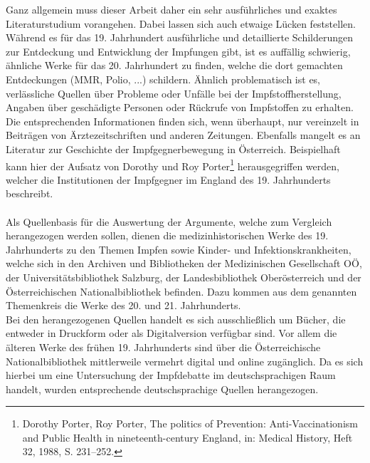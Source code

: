 \documentclass[
    a4paper,
    12pt,
    hyphens,
    chapterprefix=true,
    headheight=33pt,
    footheight=29pt,
    headings=optiontohead,
]{scrartcl}
\begin{document}
Ganz allgemein muss dieser Arbeit daher ein sehr ausführliches und exaktes Literaturstudium vorangehen. Dabei lassen sich auch etwaige Lücken feststellen. Während es für das 19. Jahrhundert ausführliche und detaillierte Schilderungen zur Entdeckung und Entwicklung der Impfungen gibt, ist es auffällig schwierig, ähnliche Werke für das 20. Jahrhundert zu finden, welche die dort gemachten Entdeckungen (MMR, Polio, ...) schildern. Ähnlich problematisch ist es, verlässliche Quellen über Probleme oder Unfälle bei der Impfstoffherstellung, Angaben über geschädigte Personen oder Rückrufe von Impfstoffen zu erhalten. Die entsprechenden Informationen finden sich, wenn überhaupt, nur vereinzelt in Beiträgen von Ärztezeitschriften und anderen Zeitungen. Ebenfalls mangelt es an Literatur zur Geschichte der Impfgegnerbewegung in Österreich. Beispielhaft kann hier der Aufsatz von Dorothy und Roy Porter\footnote{Dorothy Porter, Roy Porter, The politics of Prevention: Anti-Vaccinationism and Public Health in nineteenth-century England, in: Medical History, Heft 32, 1988, S. 231--252.} herausgegriffen werden, welcher die Institutionen der Impfgegner im England des 19. Jahrhunderts beschreibt.\\
\\
Als Quellenbasis für die Auswertung der Argumente, welche zum Vergleich herangezogen werden sollen, dienen die medizinhistorischen Werke des 19. Jahrhunderts zu den Themen Impfen sowie Kinder- und Infektionskrankheiten, welche sich in den Archiven und Bibliotheken der Medizinischen Gesellschaft OÖ, der Universitätsbibliothek Salzburg, der Landesbibliothek Oberösterreich und der Österreichischen Nationalbibliothek befinden. Dazu kommen aus dem genannten Themenkreis die Werke des 20. und 21. Jahrhunderts.\\
Bei den herangezogenen Quellen handelt es sich ausschließlich um Bücher, die entweder in Druckform oder als Digitalversion verfügbar sind. Vor allem die älteren Werke des frühen 19. Jahrhunderts sind über die Österreichische Nationalbibliothek mittlerweile vermehrt digital und online zugänglich. Da es sich hierbei um eine Untersuchung der Impfdebatte im deutschsprachigen Raum handelt, wurden entsprechende deutschsprachige Quellen herangezogen.\\
\end{document}

